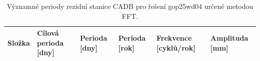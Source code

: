 \begin{table}[htbp]
\caption{Významné periody reziduí stanice CADB pro řešení gop25wd04 určené metodou FFT.}
\label{tab:gop25wd04_stcd_cadb_detr_weighted_1seg_spectral_fft_significant_periods}
\begin{tabular}{llllll}
\toprule
Složka & Cílová perioda [dny] & Perioda [dny] & Perioda [rok] & Frekvence [cyklů/rok] & Amplituda [mm] \\
\midrule
\bottomrule
\end{tabular}
\end{table}
